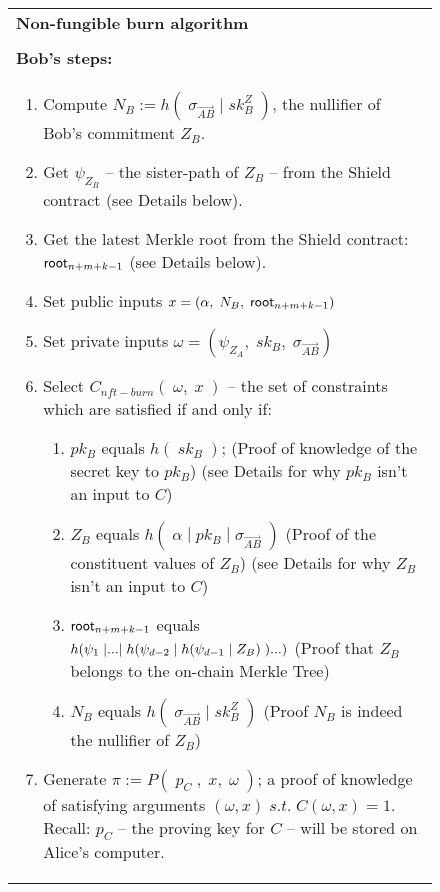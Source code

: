 \begin{figure}[htp]
  \ContinuedFloat*
	\begin{center}
		\begin{framed}
      \begin{tabular}{p{16cm}}	
        \textbf{Non-fungible burn algorithm} \\
        \\
        \midrule
        \textbf{Bob's steps:}\\
        \begin{enumerate}
          \setcounter{enumi}{\value{ongoingEnumCounter}}
          \item Compute $N_B := h(\;\sigma_{\vec{AB}}\;|\;sk^Z_B\;)$, the nullifier of Bob's commitment $Z_B$.
          \item Get $\psi_{Z_B}$ -- the sister-path of $Z_B$ -- from the Shield contract (see Details below).
          \item Get the latest Merkle root from the Shield contract: $\mathsf{root}_{n+m+k-1}$ (see Details below).
          \item Set public inputs $x = (\alpha,\;N_B,\;\mathsf{root}_{n+m+k-1})$
          \item Set private inputs $\omega = (\psi_{Z_A},\;sk_B,\;\sigma_{\vec{AB}})$
          \item Select $C_{nft-burn}(\;\omega,\;x\;)$ -- the set of constraints which are satisfied if and only if:
          \begin{enumerate}
            \item $pk_B$ equals $h(\;sk_B\;)$; (Proof of knowledge of the secret key to $pk_B$) (see Details for why $pk_B$ isn't an input to $C$)
            \item $Z_B$ equals $h(\;\alpha\;|\;pk_B\;|\;\sigma_{\vec{AB}}\;)$ (Proof of the constituent values of $Z_B$) (see Details for why $Z_B$ isn't an input to $C$)
            \item $\mathsf{root}_{n+m+k-1}$ equals $h\br*{\psi_{1}\;|...|\;h\br*{\psi_{d-2}\;|\;h\br*{\psi_{d-1}\;|\;Z_B}\;}...}$ (Proof that $Z_B$ belongs to the on-chain Merkle Tree)
            \item $N_B$ equals $h(\;\sigma_{\vec{AB}}\;|\;sk^Z_B\;)$ (Proof $N_B$ is indeed the nullifier of $Z_B$)
          \end{enumerate}
          \item Generate $\pi := P(\;p_C\;,\;x,\;\omega\;)$; a proof of knowledge of satisfying arguments $(\omega, x)\;s.t.\;C(\omega, x) = 1$. Recall: $p_C$ -- the proving key for $C$ -- will be stored on Alice's computer.
           

\end{enumerate}
\end{tabular}
\end{framed}
\end{center}
\end{figure}
